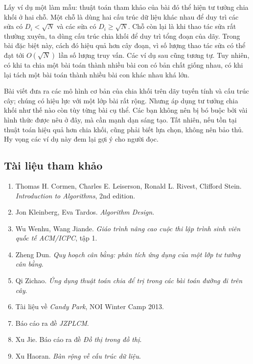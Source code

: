 \documentclass[11pt]{article}
\begin{document}
Lấy ví dụ một làm mẫu: thuật toán tham khảo của bài đó thể hiện tư tưởng chia
khối ở hai chỗ. Một chỗ là dùng hai cấu trúc dữ liệu khác nhau để duy trì các
sửa có \(D_i<\sqrt N\) và các sửa có \(D_i\ge\sqrt N\). Chỗ còn lại là khi
thao tác sửa rất thường xuyên, ta dùng cấu trúc chia khối để duy trì tổng
đoạn của dãy. Trong bài đặc biệt này, cách đó hiệu quả hơn cây đoạn, vì số
lượng thao tác sửa có thể đạt tới \(O(\sqrt N)\) lần số lượng truy vấn. Các
ví dụ sau cũng tương tự. Tuy nhiên, có khi ta chia một bài toán thành nhiều
bài con có bản chất giống nhau, có khi lại tách một bài toán thành nhiều bài
con khác nhau khá lớn.

Bài viết đưa ra các mô hình cơ bản của chia khối trên dãy tuyến tính và cấu
trúc cây; chúng có hiệu lực với một lớp bài rất rộng. Nhưng áp dụng tư tưởng
chia khối như thế nào còn tùy từng bài cụ thể. Các bạn không nên bị bó buộc
bởi vài hình thức được nêu ở đây, mà cần mạnh dạn sáng tạo. Tất nhiên, nếu
tồn tại thuật toán hiệu quả hơn chia khối, cũng phải biết lựa chọn, không nên
bảo thủ. Hy vọng các ví dụ này đem lại gợi ý cho người đọc.

\subsection{Tài liệu tham khảo}

\begin{enumerate}
  \item Thomas H. Cormen, Charles E. Leiserson, Ronald L. Rivest, Clifford
  Stein. \emph{Introduction to Algorithms}, 2nd edition.
  \item Jon Kleinberg, Eva Tardos. \emph{Algorithm Design}.
  \item Wu Wenhu, Wang Jiande. \emph{Giáo trình nâng cao cuộc thi lập trình
  sinh viên quốc tế ACM/ICPC}, tập 1.
  \item Zheng Dun. \emph{Quy hoạch cân bằng: phân tích ứng dụng của một lớp
  tư tưởng cân bằng}.
  \item Qi Zichao. \emph{Ứng dụng thuật toán chia để trị trong các bài toán
  đường đi trên cây}.
  \item Tài liệu về \emph{Candy Park}, NOI Winter Camp 2013.
  \item Báo cáo ra đề \emph{JZPLCM}.
  \item Xu Jie. Báo cáo ra đề \emph{Đồ thị trong đồ thị}.
  \item Xu Haoran. \emph{Bàn rộng về cấu trúc dữ liệu}.
\end{enumerate}
\end{document}
